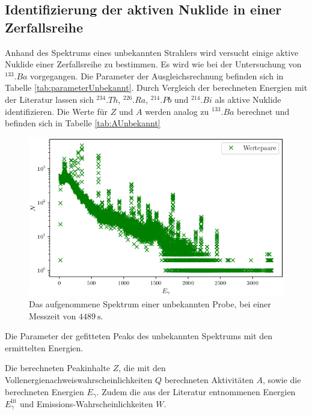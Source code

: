\subsection{Identifizierung der aktiven Nuklide in einer Zerfallsreihe}

Anhand des Spektrums eines unbekannten Strahlers wird versucht einige aktive Nuklide einer Zerfallsreihe zu bestimmen. Es wird wie bei der Untersuchung von $^{133}.{Ba}$ vorgegangen. Die Parameter der Ausgleichsrechnung befinden sich in Tabelle \ref{tab:parameterUnbekannt}. Durch Vergleich der berechneten Energien mit der Literatur \cite{V18} lassen sich $^{234}.{Th}$, $^{226}.{Ra}$, $^{214}.{Pb}$ und $^{214}.{Bi}$ als aktive Nuklide identifizieren. Die Werte für $Z$ und $A$ werden analog zu $^{133}.{Ba}$ berechnet und befinden sich in Tabelle \ref{tab:AUnbekannt}

\begin{figure}
	\centering
	\includegraphics[width=\linewidth-70pt,height=\textheight-70pt,keepaspectratio]{content/images/unbekannt.png}
	\caption{Das aufgenommene Spektrum einer unbekannten Probe, bei einer Messzeit von $\SI{4489}{\second}$.}
	\label{fig:SpektrumUnbekannt}
\end{figure}

\begin{table}
	\centering
	\caption{Die Parameter der gefitteten Peaks des unbekannten Spektrums mit den ermittelten Energien.}
	
	\label{tab:parameterUnbekannt}
\end{table}

\begin{table}
	\centering
	\caption{Die berechneten Peakinhalte $Z$, die mit den Vollenergienachweiswahrscheinlichkeiten $Q$ berechneten Aktivitäten $A$, sowie die berechneten Energien $E_\gamma$. Zudem die aus der Literatur entnommenen Energien $E_\gamma^\text{lit}$ und Emissions-Wahrscheinlichkeiten $W$.}
	
	\label{tab:AUnbekannt}
\end{table}

